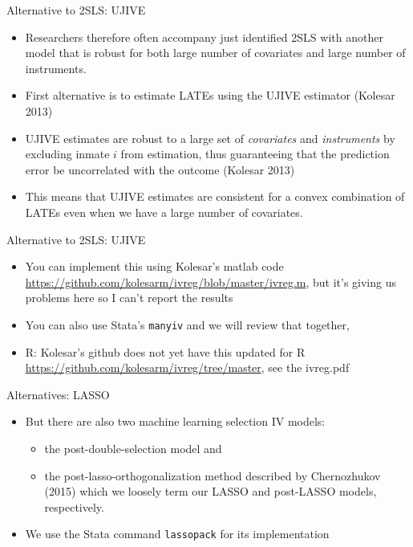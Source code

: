 \documentclass{beamer}
\begin{document}
\begin{frame}{Alternative to 2SLS: UJIVE}

\begin{itemize}
\item Researchers therefore often accompany just identified 2SLS with another model that is robust for both large number of covariates and large number of instruments.  

\item First alternative is to estimate LATEs using the UJIVE estimator (Kolesar 2013)

\item UJIVE estimates are robust to a large set of \emph{covariates} and \emph{instruments} by excluding inmate $i$ from estimation, thus guaranteeing that the prediction error be uncorrelated with the outcome (Kolesar 2013)

\item This means that UJIVE estimates are consistent for a convex combination of LATEs even when we have a large number of covariates. 
\end{itemize}
\end{frame}


\begin{frame}{Alternative to 2SLS: UJIVE}

\begin{itemize}

\item You can implement this using Kolesar's matlab code \url{https://github.com/kolesarm/ivreg/blob/master/ivreg.m}, but it's giving us problems here so I can't report the results

\item You can also use Stata's \texttt{manyiv} and we will review that together, 

\item R: Kolesar's github does not yet have this updated for R \url{https://github.com/kolesarm/ivreg/tree/master}, see the ivreg.pdf

\end{itemize}

\end{frame}


\begin{frame}{Alternatives: LASSO}

\begin{itemize}
\item But there are also two machine learning selection IV models: 
    \begin{itemize}
    \item the post-double-selection model and 
    \item the post-lasso-orthogonalization method described by Chernozhukov (2015) which we loosely term our LASSO and post-LASSO models, respectively.  
    \end{itemize}
\item We use the Stata command \texttt{lassopack} for its implementation 
\end{itemize}

\end{frame}
\end{document}
